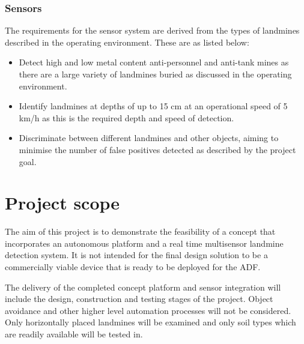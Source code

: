 \documentclass[main.tex]{subfiles}
\begin{document}
\subsubsection{Sensors}
The requirements for the sensor system are derived from the types of landmines described in the operating environment. These are as listed below:
\begin{itemize}
\item Detect high and low metal content anti-personnel and anti-tank mines as there are a large variety of landmines buried as discussed in the operating environment. 
\item Identify landmines at depths of up to 15 cm at an operational speed of 5 km/h as this is the required depth and speed of detection.
\item Discriminate between different landmines and other objects, aiming to minimise the number of false positives detected as described by the project goal.
\end{itemize}

\section{Project scope}


The aim of this project is to demonstrate the feasibility of a concept that incorporates an autonomous platform and a real time multisensor landmine detection system. It is not intended for the final design solution to be a commercially viable device that is ready to be deployed for the ADF. 

The delivery of the completed concept platform and sensor integration will include the design, construction and testing stages of the project. Object avoidance and other higher level automation processes will not be considered. Only horizontally placed landmines will be examined and only soil types which are readily available will be tested in. 
\end{document}
